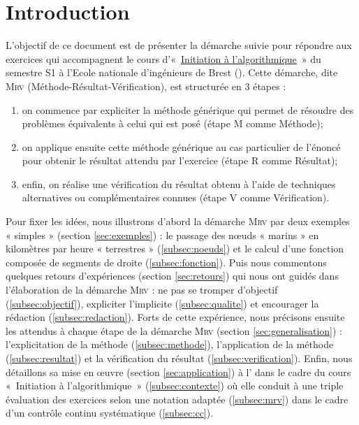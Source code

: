 \section{Introduction}
L'objectif de ce document est de présenter la démarche 
suivie pour répondre aux exercices qui accompagnent le cours 
d'«~\href{http://www.enib.fr/~tisseau/pdf/course/info-S1.pdf}{Initiation à l'algorithmique}~» 
du semestre S1 à l'Ecole nationale d'ingénieurs de Brest (\enib). 
Cette démarche, dite \textsc{Mrv} (Méthode-Résultat-Vérification), est structurée en 3 étapes : 
\begin{enumerate}
\item on commence par expliciter la méthode générique qui permet de résoudre 
	des problèmes équivalents à celui qui est posé 
	(étape M comme Méthode);

\item on applique ensuite cette méthode générique au cas particulier de l'énoncé 
	pour obtenir le résultat attendu par l'exercice 
	(étape R comme Résultat);

\item enfin, on réalise une vérification du résultat obtenu à l'aide de techniques
	alternatives ou complémentaires connues
	(étape V comme Vérification).
\end{enumerate}
Pour fixer les idées, nous illustrons d'abord la démarche \textsc{Mrv} par deux exemples « simples »
(section \ref{sec:exemples}) : le passage des n\oe uds « marins » en 
kilomètres par heure « terrestres » (\ref{subsec:noeuds}) et
le calcul d'une fonction composée de segments de droite (\ref{subsec:fonction}).
Puis nous commentons quelques retours d'expériences (section \ref{sec:retours})
qui nous ont guidés dans l'élaboration de la démarche \textsc{Mrv} :
ne pas se tromper d'objectif (\ref{subsec:objectif}), expliciter l'implicite 
(\ref{subsec:qualite}) et encourager la rédaction (\ref{subsec:redaction}).
Forts de cette expérience, nous précisons ensuite les attendus à chaque étape
de la démarche \textsc{Mrv} (section \ref{sec:generalisation}) :
l'explicitation de la méthode (\ref{subsec:methode}), 
l'application de la méthode (\ref{subsec:resultat})
et la vérification du résultat (\ref{subsec:verification}).
Enfin, nous détaillons sa mise en \oe uvre (section \ref{sec:application})
à l'\enib{} dans le cadre du cours «~Initiation à l'algorithmique~» (\ref{subsec:contexte})
où elle conduit à une triple évaluation des exercices selon 
une notation adaptée (\ref{subsec:mrv}) dans le cadre d'un contrôle continu systématique
(\ref{subsec:cc}).

